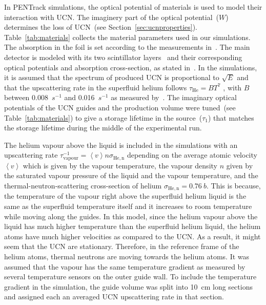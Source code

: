 


In PENTrack simulations, the optical potential of materials is used to
model their interaction with UCN. The imaginery part of the optical
potential~($W$) determines the loss of UCN~(see
Section~\ref{sec:ucnproperties}). Table~\ref{tab:materials} collects
the material parameters used in our simulations. The absorption in the
foil is set according to the measurements
in~\cite{atchison2009transmission}. The main detector is modeled with
its two scintillator layers~\cite{jamieson2017characterization} and
their corresponding optical potentials and absorption cross-section,
as stated in~\cite{Ban2016}. In the simulations, it is assumed that
the spectrum of produced UCN is proportional to $\sqrt{E}$ and that
the upscattering rate in the superfluid helium follows
$\tau_\mathrm{He} = B T^7$ , with $B$ between 0.008~$s^{-1}$ and
0.016~$s^{-1}$ as measured by~\cite{Leung2016}. The imaginary optical
potentials of the UCN guides and the production volume were tuned~(see
Table~\ref{tab:materials}) to give a storage lifetime in the
source~($\tau_1$) that matches the storage lifetime during the middle
of the experimental run.


The helium vapour above the liquid is included in the simulations with
an upscattering rate
$\tau^{-1}_\mathrm{vapour} = \left< v \right> n \sigma_\mathrm{He,n}$
depending on the average atomic velocity $\left < v \right>$ which is
given by the vapour temperature, the vapour density $n$ given by the
saturated vapour pressure of the liquid and the vapour temperature,
and the thermal-neutron-scattering cross-section of helium
$\sigma_\mathrm{He,n} = 0.76~b$. This is because, the temperature of
the vapour right above the superfluid helium liquid is the same as the
superfluid temperature itself and it increases to room temperature
while moving along the guides. In this model, since the helium vapour
above the liquid has much higher temperature than the superfluid
helium liquid, the helium atoms have much higher velocities as
compared to the UCN. As a result, it might seem that the UCN are
stationary. Therefore, in the reference frame of the helium atoms,
thermal neutrons are moving towards the helium atoms.  It was assumed
that the vapour has the same temperature gradient as measured by
several temperature sensors on the outer guide wall. To include the
temperature gradient in the simulation, the guide volume was split
into 10~cm long sections and assigned each an averaged UCN
upscattering rate in that section.


